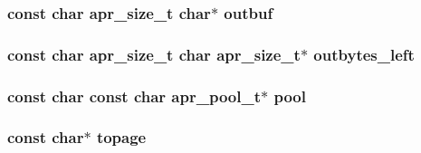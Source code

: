 \subsubsection[{\texorpdfstring{outbuf}{outbuf}}]{\setlength{\rightskip}{0pt plus 5cm}const char {\bf apr\+\_\+size\+\_\+t} char$\ast$ outbuf}\hypertarget{group__APR__XLATE_gac9a480cdf87742a4e756521e92b30e4d}{}\label{group__APR__XLATE_gac9a480cdf87742a4e756521e92b30e4d}
\subsubsection[{\texorpdfstring{outbytes\+\_\+left}{outbytes_left}}]{\setlength{\rightskip}{0pt plus 5cm}const char {\bf apr\+\_\+size\+\_\+t} char {\bf apr\+\_\+size\+\_\+t}$\ast$ outbytes\+\_\+left}\hypertarget{group__APR__XLATE_ga52d059f5a291f7a81d4403229554cf57}{}\label{group__APR__XLATE_ga52d059f5a291f7a81d4403229554cf57}
\subsubsection[{\texorpdfstring{pool}{pool}}]{\setlength{\rightskip}{0pt plus 5cm}const char const char {\bf apr\+\_\+pool\+\_\+t}$\ast$ pool}\hypertarget{group__APR__XLATE_gabb3cd978f04c73d0b763c391e9bfde73}{}\label{group__APR__XLATE_gabb3cd978f04c73d0b763c391e9bfde73}
\subsubsection[{\texorpdfstring{topage}{topage}}]{\setlength{\rightskip}{0pt plus 5cm}const char$\ast$ topage}\hypertarget{group__APR__XLATE_ga9d36953130bf2d9095b125ce6612746b}{}\label{group__APR__XLATE_ga9d36953130bf2d9095b125ce6612746b}
